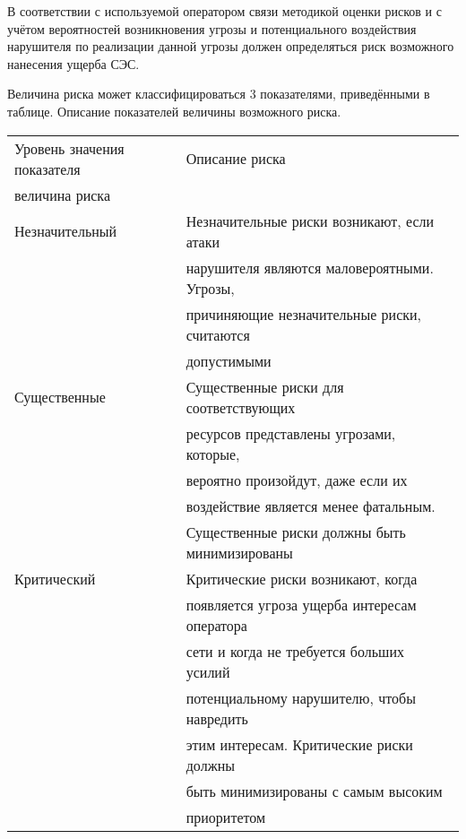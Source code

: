 \documentclass[12pt, russian, oneside, article]{ncc}
\begin{document}
В соответствии с используемой оператором связи методикой оценки рисков и с учётом вероятностей возникновения угрозы и потенциального воздействия нарушителя по реализации данной угрозы должен определяться риск возможного нанесения ущерба СЭС.

Величина риска может классифицироваться 3 показателями, приведёнными в таблице. Описание показателей величины возможного риска. 


\begin{center}
\begin{tabular}{ll}
 Уровень значения показателя  &  Описание риска                                 \\
 величина риска               &                                                 \\
\hline
 Незначительный               &  Незначительные риски возникают, если атаки     \\
                              &  нарушителя являются маловероятными. Угрозы,    \\
                              &  причиняющие незначительные риски, считаются    \\
                              &  допустимыми                                    \\
\hline
 Существенные                 &  Существенные риски для соответствующих         \\
                              &  ресурсов представлены угрозами, которые,       \\
                              &  вероятно произойдут, даже если их              \\
                              &  воздействие является менее фатальным.          \\
                              &  Существенные риски должны быть минимизированы  \\
\hline
 Критический                  &  Критические риски возникают, когда             \\
                              &  появляется угроза ущерба интересам оператора   \\
                              &  сети и когда не требуется больших усилий       \\
                              &  потенциальному нарушителю, чтобы навредить     \\
                              &  этим интересам. Критические риски должны       \\
                              &  быть минимизированы с самым высоким            \\
                              &  приоритетом                                    \\
\end{tabular}
\end{center}
\end{document}
